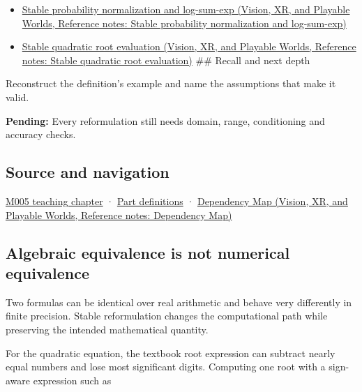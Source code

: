 \begin{itemize}
\tightlist
\item
  \href{../07-Vision-XR-and-Playable-Worlds/main.pdf\#nameddest=appendix-d580b422240f}{Stable probability normalization and log-sum-exp (Vision, XR, and Playable Worlds, Reference notes: Stable probability normalization and log-sum-exp)}
\item
  \href{../07-Vision-XR-and-Playable-Worlds/main.pdf\#nameddest=appendix-b9afba7f63e5}{Stable quadratic root evaluation (Vision, XR, and Playable Worlds, Reference notes: Stable quadratic root evaluation)} \#\# Recall and next depth
\end{itemize}

Reconstruct the definition's example and name the assumptions that make it valid.

\textbf{Pending:} Every reformulation still needs domain, range, conditioning and accuracy checks.

\subsection{Source and navigation}\label{appendix-d7f8ba961670-source-and-navigation}

\hypertarget{appendix-d7f8ba961670-source-and-navigation}{}

\hyperref[01-foundations-i-ch001-when-arithmetic-meets-uncertainty]{M005 teaching chapter} · \hyperref[appendix-fd090d982a15-m005---parts-77-88]{Part definitions} · \href{../07-Vision-XR-and-Playable-Worlds/main.pdf\#nameddest=appendix-4ad47bdd269a}{Dependency Map (Vision, XR, and Playable Worlds, Reference notes: Dependency Map)}

\subsection{Algebraic equivalence is not numerical equivalence}\label{appendix-d7f8ba961670-algebraic-equivalence-is-not-numerical-equivalence}

\hypertarget{appendix-d7f8ba961670-algebraic-equivalence-is-not-numerical-equivalence}{}

Two formulas can be identical over real arithmetic and behave very differently in finite precision. Stable reformulation changes the computational path while preserving the intended mathematical quantity.

For the quadratic equation, the textbook root expression can subtract nearly equal numbers and lose most significant digits. Computing one root with a sign-aware expression such as

